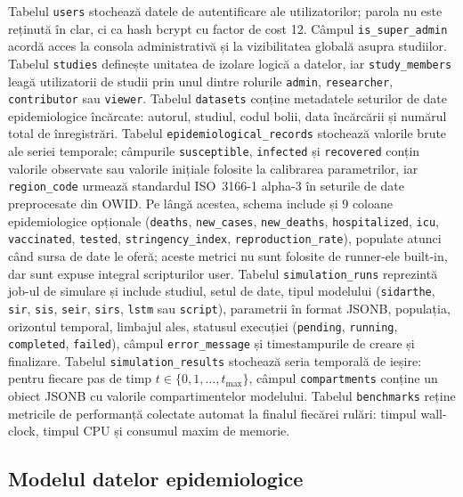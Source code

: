 Tabelul \texttt{users} stochează datele de autentificare ale utilizatorilor;
parola nu este reținută în clar, ci ca hash bcrypt cu factor de cost 12.
Câmpul \texttt{is\_super\_admin} acordă acces la consola administrativă și la
vizibilitatea globală asupra studiilor. Tabelul \texttt{studies} definește
unitatea de izolare logică a datelor, iar \texttt{study\_members} leagă
utilizatorii de studii prin unul dintre rolurile \texttt{admin},
\texttt{researcher}, \texttt{contributor} sau \texttt{viewer}. Tabelul
\texttt{datasets} conține metadatele seturilor de date epidemiologice
încărcate: autorul, studiul, codul bolii, data încărcării și numărul total de
înregistrări. Tabelul \texttt{epidemiological\_records} stochează valorile
brute ale seriei temporale; câmpurile \texttt{susceptible},
\texttt{infected} și \texttt{recovered} conțin valorile observate sau valorile
inițiale folosite la calibrarea parametrilor, iar \texttt{region\_code} urmează
standardul ISO~3166-1 alpha-3 în seturile de date preprocesate din OWID.
Pe lângă acestea, schema include și 9 coloane epidemiologice opționale
(\texttt{deaths}, \texttt{new\_cases}, \texttt{new\_deaths},
\texttt{hospitalized}, \texttt{icu}, \texttt{vaccinated}, \texttt{tested},
\texttt{stringency\_index}, \texttt{reproduction\_rate}), populate atunci
când sursa de date le oferă; aceste metrici nu sunt folosite de runner-ele
built-in, dar sunt expuse integral scripturilor user.
Tabelul \texttt{simulation\_runs} reprezintă job-ul de simulare și include
studiul, setul de date, tipul modelului (\texttt{sidarthe}, \texttt{sir},
\texttt{sis}, \texttt{seir}, \texttt{sirs}, \texttt{lstm} sau \texttt{script}),
parametrii în format JSONB, populația, orizontul temporal, limbajul ales,
statusul execuției (\texttt{pending}, \texttt{running}, \texttt{completed},
\texttt{failed}), câmpul \texttt{error\_message} și timestampurile de creare și
finalizare. Tabelul \texttt{simulation\_results} stochează seria temporală de
ieșire: pentru fiecare pas de timp $t \in \{0,1,\ldots,t_{\max}\}$, câmpul
\texttt{compartments} conține un obiect JSONB cu valorile compartimentelor
modelului. Tabelul \texttt{benchmarks} reține metricile de performanță
colectate automat la finalul fiecărei rulări: timpul wall-clock, timpul CPU și
consumul maxim de memorie.

\subsection{Modelul datelor epidemiologice}
\label{subsec:model_date}

